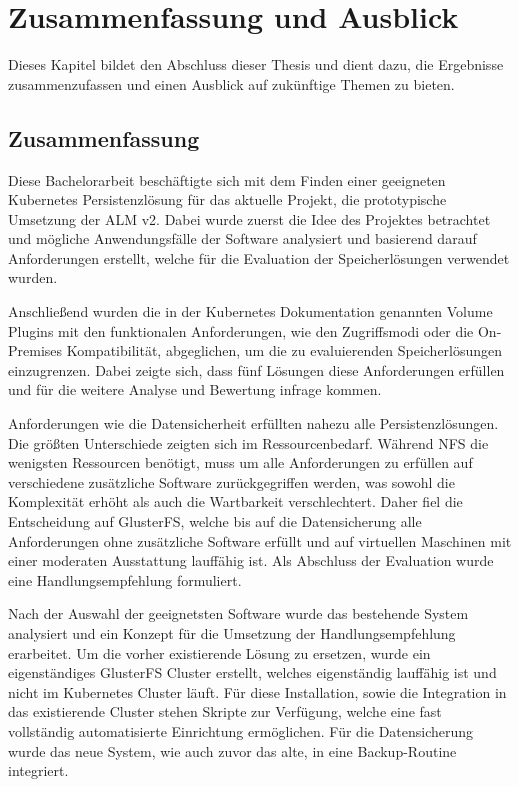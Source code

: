 \chapter{Zusammenfassung und Ausblick}
\label{cha:schluss}
Dieses Kapitel bildet den Abschluss dieser Thesis und dient dazu, die Ergebnisse zusammenzufassen und einen Ausblick auf zukünftige Themen zu bieten.

\section{Zusammenfassung} %
\label{sec:zusammenfassung}
Diese Bachelorarbeit beschäftigte sich mit dem Finden einer geeigneten Kubernetes Persistenzlösung für das aktuelle Projekt, die prototypische Umsetzung der ALM v2. Dabei wurde zuerst die Idee des Projektes betrachtet und mögliche Anwendungsfälle der Software analysiert und basierend darauf Anforderungen erstellt, welche für die Evaluation der Speicherlösungen verwendet wurden. \medskip

Anschließend wurden die in der Kubernetes Dokumentation genannten Volume Plugins mit den funktionalen Anforderungen, wie den Zugriffsmodi oder die On-Premises Kompatibilität, abgeglichen, um die zu evaluierenden Speicherlösungen einzugrenzen. Dabei zeigte sich, dass fünf Lösungen diese Anforderungen erfüllen und für die weitere Analyse und Bewertung infrage kommen. \medskip

Anforderungen wie die Datensicherheit erfüllten nahezu alle Persistenzlösungen. Die größten Unterschiede zeigten sich im Ressourcenbedarf. Während NFS die wenigsten Ressourcen benötigt, muss um alle Anforderungen zu erfüllen auf verschiedene zusätzliche Software zurückgegriffen werden, was sowohl die Komplexität erhöht als auch die Wartbarkeit verschlechtert. Daher fiel die Entscheidung auf GlusterFS, welche bis auf die Datensicherung alle Anforderungen ohne zusätzliche Software erfüllt und auf virtuellen Maschinen mit einer moderaten Ausstattung lauffähig ist. Als Abschluss der Evaluation wurde eine Handlungsempfehlung formuliert. \medskip

Nach der Auswahl der geeignetsten Software wurde das bestehende System analysiert und ein Konzept für die Umsetzung der Handlungsempfehlung erarbeitet. Um die vorher existierende Lösung zu ersetzen, wurde ein eigenständiges GlusterFS Cluster erstellt, welches eigenständig lauffähig ist und nicht im Kubernetes Cluster läuft. Für diese Installation, sowie die Integration in das existierende Cluster stehen Skripte zur Verfügung, welche eine fast vollständig automatisierte Einrichtung ermöglichen. Für die Datensicherung wurde das neue System, wie auch zuvor das alte, in eine Backup-Routine integriert. \medskip

